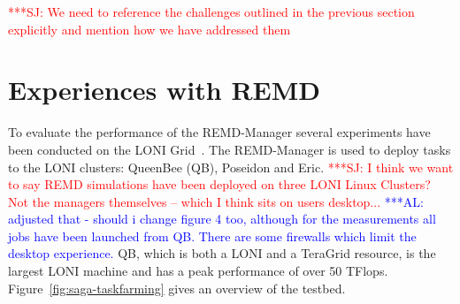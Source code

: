 \documentclass{rspublic}
\newcommand{\alnote}[1]{ {\textcolor{blue} { ***AL: #1 }}}
\newcommand{\jhanote}[1]{ {\textcolor{red} { ***SJ: #1 }}}
\newcommand{\alnote}[1]{}
\newcommand{\jhanote}[1]{}
\newcommand{\glidein}[1]{Glide-In }
\begin{document}

  
    



\jhanote{We need to reference the challenges outlined in the previous
  section explicitly and mention how we have addressed them}

\section{Experiences with REMD}
\label{sec:exp}       
        
To evaluate the performance of the REMD-Manager several
experiments have been conducted on the LONI
Grid~\citep{loni}. The REMD-Manager is used to deploy tasks to
the LONI clusters: QueenBee (QB), Poseidon and Eric.  \jhanote{I think
  we want to say REMD simulations have been deployed on three LONI
  Linux Clusters? Not the managers themselves -- which I think sits on
  users desktop...}  \alnote{adjusted that - should i change figure 4
  too, although for the measurements all jobs have been launched from
  QB. There are some firewalls which limit the desktop experience.}
QB, which is both a LONI and a TeraGrid resource, is the largest LONI
machine and has a peak performance of over 50 TFlops.
Figure~\ref{fig:saga-taskfarming} gives an overview of the testbed.
\end{document}
